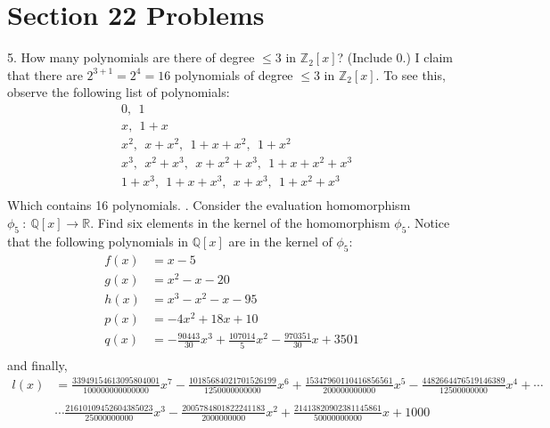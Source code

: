 \documentclass{article}
\begin{document}
\section*{Section 22 Problems}
5. How many polynomials are there of degree $\leq 3$ in $\mathbb{Z}_2[x]$? (Include 0.)
\newline\newline
I claim that there are $2^{3+1} = 2^4 = 16$ polynomials of degree $\leq 3$ in $\mathbb{Z}_2[x]$. To see this, observe the following list of polynomials:
\begin{align*}
    &0,\:\: 1 \\
    &x,\:\: 1 + x \\
    &x^2, \:\: x + x^2, \:\: 1 + x + x^2, \:\: 1 + x^2 \\
    &x^3,\:\: x^2 + x^3, \:\: x + x^2 + x^3, \:\: 1 + x + x^2 + x^3 \\
    &1 + x^3, \:\: 1 + x + x^3, \:\: x + x^3, \:\: 1 + x^2 + x^3 \\
\end{align*}
Which contains 16 polynomials.
\newline{}. Consider the evaluation homomorphism $\phi_5 \: : \: \mathbb{Q}[x] \to \mathbb{R}$. Find six elements in the kernel of the homomorphism $\phi_5$.
\newline\newline
Notice that the following polynomials in $\mathbb{Q}[x]$ are in the kernel of $\phi_5$:
\begin{align*}
    f(x) &= x-5 \\
    g(x) &= x^2 - x - 20 \\
    h(x) &= x^3 - x^2 - x - 95 \\
    p(x) &= -4x^2 + 18x + 10 \\
    q(x) &= -\frac{90443}{30}x^3 + \frac{107014}{5}x^2 - \frac{970351}{30}x + 3501 \\
\end{align*}
and finally,
\newpage
\begin{align*}
    l(x) &= \frac{33949154613095804001}{100 000 000 000 000}x^7 - \frac{10185684021701526199}{1 250 000 000 000}x^6 + \frac{15347960110416856561}{200 000 000 000}x^5 - \frac{4482664476519146389}{12 500 000 000}x^4 + \cdots \\
    \\
    &\cdots \frac{21610109452604385023}{25 000 000 000}x^3 - \frac{2005784801822241183}{2 000 000 000}x^2 + \frac{21413820902381145861}{50 000 000 000}x + 1000\\
\end{align*}
\end{document}
